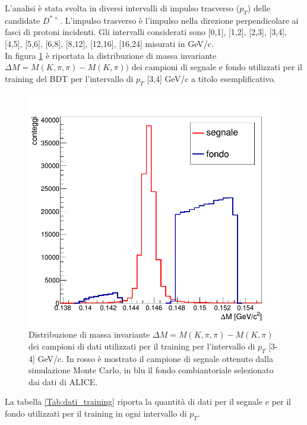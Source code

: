 L'analisi \`e stata svolta in diversi intervalli di impulso trasverso ($p_T$) delle candidate $D^{*+}$. L'impulso trasverso \`e l'impulso nella direzione perpendicolare ai fasci di protoni incidenti. Gli intervalli considerati sono [0,1], [1,2], [2,3], [3,4], [4,5], [5,6], [6,8], [8,12], [12,16], [16,24] misurati in GeV/c. 
\\In figura \ref{fig:dati_training} è riportata la distribuzione di massa invariante $\Delta M = M(K,\pi,\pi)-M(K,\pi))$ dei campioni di segnale e fondo utilizzati per il training del BDT per l'intervallo di $p_T$ [3,4] GeV/c a titolo esemplificativo. 

    \begin{figure}[htbp] 
        \centering
        \includegraphics[width=0.7\linewidth]{training&testing/dati_training.png}
        \caption{Distribuzione di massa invariante $\Delta M = M(K,\pi,\pi)-M(K,\pi)$ dei campioni di dati utilizzati per il training per l'intervallo di $p_T$ [3-4] GeV/c. In rosso \`e mostrato il campione di segnale ottenuto dalla simulazione Monte Carlo, in blu il fondo combiantoriale selezionato dai dati di ALICE.}
        \label{fig:dati_training}
    \end{figure}
    
La tabella \ref{Tab:dati_training} riporta la quantità di dati per il segnale e per il fondo utilizzati per il training in ogni intervallo di $p_T$. 
 
